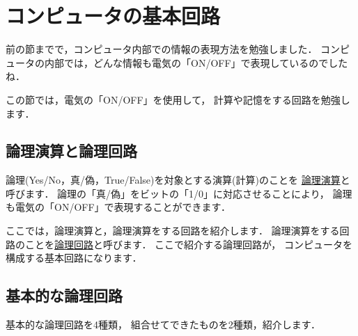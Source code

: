 \vspace{0.2cm}

\section{コンピュータの基本回路}

前の節までで，コンピュータ内部での情報の表現方法を勉強しました．
コンピュータの内部では，どんな情報も電気の「ON/OFF」で表現しているのでしたね．

この節では，電気の「ON/OFF」を使用して，
計算や記憶をする回路を勉強します．

\subsection{論理演算と論理回路}

論理(Yes/No，真/偽，True/False)を対象とする演算(計算)のことを
\underline{論理演算}と呼びます．
論理の「真/偽」をビットの「1/0」に対応させることにより，
論理も電気の「ON/OFF」で表現することができます．

ここでは，論理演算と，論理演算をする回路を紹介します．
論理演算をする回路のことを\underline{論理回路}と呼びます．
ここで紹介する論理回路が，
コンピュータを構成する基本回路になります．

\subsection{基本的な論理回路}

基本的な論理回路を4種類，
組合せてできたものを2種類，紹介します．

